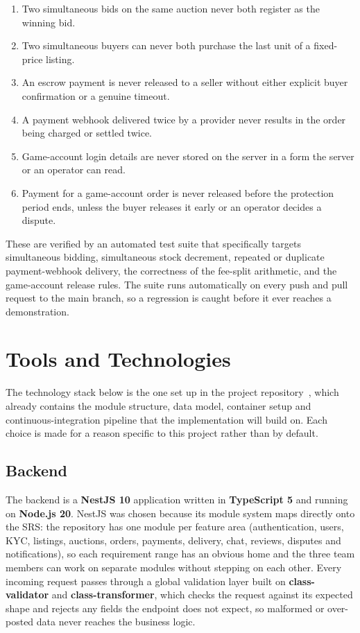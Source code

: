 \documentclass[11pt,a4paper]{article}
\begin{document}
\begin{enumerate}
  \item Two simultaneous bids on the same auction never both register as the winning bid.
  \item Two simultaneous buyers can never both purchase the last unit of a fixed-price listing.
  \item An escrow payment is never released to a seller without either explicit buyer confirmation or a
  genuine timeout.
  \item A payment webhook delivered twice by a provider never results in the order being charged or
  settled twice.
  \item Game-account login details are never stored on the server in a form the server or an operator
  can read.
  \item Payment for a game-account order is never released before the protection period ends, unless the
  buyer releases it early or an operator decides a dispute.
\end{enumerate}

These are verified by an automated test suite that specifically targets simultaneous bidding,
simultaneous stock decrement, repeated or duplicate payment-webhook delivery, the correctness of the
fee-split arithmetic, and the game-account release rules. The suite runs automatically on every push and
pull request to the main branch, so a regression is caught before it ever reaches a demonstration.

\section{Tools and Technologies}

The technology stack below is the one set up in the project repository~\cite{repo}, which already
contains the module structure, data model, container setup and continuous-integration pipeline that
the implementation will build on. Each choice is made for a reason specific to this project rather than
by default.

\subsection{Backend}

The backend is a \textbf{NestJS 10} application written in \textbf{TypeScript 5} and running on
\textbf{Node.js 20}. NestJS was chosen because its module system maps directly onto the SRS: the
repository has one module per feature area (authentication, users, KYC, listings, auctions, orders,
payments, delivery, chat, reviews, disputes and notifications), so each requirement range has an obvious
home and the three team members can work on separate modules without stepping on each other. Every
incoming request passes through a global validation layer built on \textbf{class-validator} and
\textbf{class-transformer}, which checks the request against its expected shape and rejects any fields the
endpoint does not expect, so malformed or over-posted data never reaches the business logic.
\end{document}
